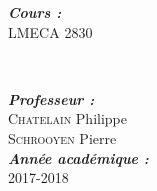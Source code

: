 \begin{titlepage}
\begin{minipage}{0.4\textwidth}
\begin{flushleft}
\emph{\textbf{Cours :\ }}\\\textsc{\large LMECA 2830} %


\end{flushleft}
\end{minipage}
~
\begin{minipage}{0.4\textwidth}
\begin{flushright} \large

\emph{\textbf{Professeur :}} \\
\textsc{Chatelain} Philippe\\
\textsc{Schrooyen} Pierre\\ [0,4cm]

\emph{\textbf{Année académique :\ }}\\\textsc{\large 2017-2018}\\[0.4cm] %


\end{flushright}
\end{minipage}\\[0cm]


~
\begin{minipage}{0.4\textwidth}

\end{minipage}

\vfill %

\end{titlepage}
